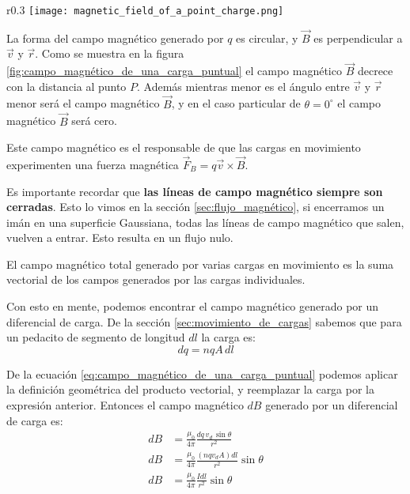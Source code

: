 \begin{wrapfigure}{r}{0.3\textwidth}
  \centering
  \texttt{[image: magnetic\_field\_of\_a\_point\_charge.png]}
  \caption{Campo magnético de una carga puntual.}
  \label{fig:campo_magnético_de_una_carga_puntual}
\end{wrapfigure}
La forma del campo magnético generado por \(q\) es circular, y \(\vec{B}\) es perpendicular a \(\vec{v}\) y \(\vec{r}\). Como se muestra en la figura \ref{fig:campo_magnético_de_una_carga_puntual} el campo magnético \(\vec{B}\) decrece con la distancia al punto \(P\). Además mientras menor es el ángulo entre \(\vec{v}\) y \(\vec{r}\) menor será el campo magnético \(\vec{B}\), y en el caso particular de \(\theta = 0^\circ\) el campo magnético \(\vec{B}\) será cero. 

Este campo magnético es el responsable de que las cargas en movimiento experimenten una fuerza magnética \(\vec{F}_B = q\vec{v} \times \vec{B}\).

Es importante recordar que \textbf{las líneas de campo magnético siempre son cerradas}. Esto lo vimos en la sección \ref{sec:flujo_magnético}, si encerramos un imán en una superficie Gaussiana, todas las líneas de campo magnético que salen, vuelven a entrar. Esto resulta en un flujo nulo.

\begin{tcolorbox}[myconclusion]
  El campo magnético total generado por varias cargas en movimiento es la suma vectorial de los campos generados por las cargas individuales.
\end{tcolorbox}

Con esto en mente, podemos encontrar el campo magnético generado por un diferencial de carga. De la sección \ref{sec:movimiento_de_cargas} sabemos que para un pedacito de segmento de longitud \(dl\) la carga es:
\[
dq = nqA\, dl
\]

De la ecuación \ref{eq:campo_magnético_de_una_carga_puntual} podemos aplicar la definición geométrica del producto vectorial, y reemplazar la carga por la expresión anterior. Entonces el campo magnético \(dB\) generado por un diferencial de carga es:
\begin{align*}
  dB &= \frac{\mu_0}{4\pi} \frac{dq \, v_d \, \sin\theta}{r^2} \\
  dB &= \frac{\mu_0}{4\pi} \frac{\left(nq v_d A\right) dl}{r^2} \sin\theta \\ 
  dB &= \frac{\mu_0}{4\pi} \frac{I dl}{r^2} \sin\theta 
\end{align*}

